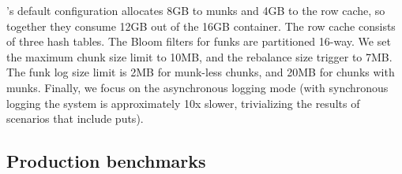 \sys's default configuration 
allocates 8GB to munks and 4GB to the row cache,
so together they consume 12GB out of the 16GB container. 
The row cache consists of three hash tables.  
The Bloom filters for funks are partitioned 16-way.  
We set the \sys\/ maximum chunk size limit to 10MB, and the rebalance size trigger to 7MB. 
The funk log size limit is 2MB for munk-less chunks, and 20MB for chunks with munks. 
Finally, we focus on the asynchronous logging mode (with synchronous logging the system
is approximately 10x slower, trivializing the results of scenarios that include puts). 


\subsection{Production benchmarks}
\label{ssec:prod}
